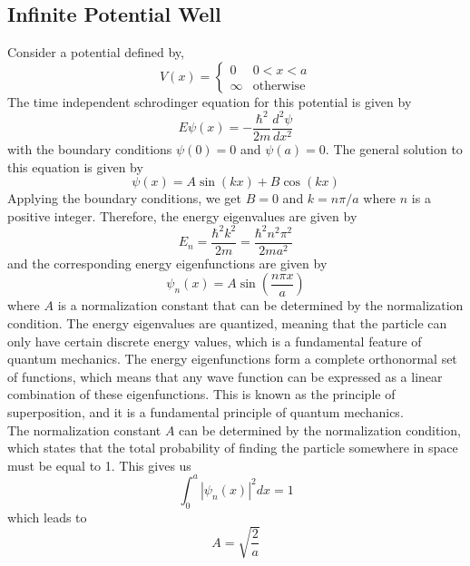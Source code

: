 \documentclass{article}
\begin{document}
\subsection{Infinite Potential Well}
Consider a potential defined by,
\[V(x) = \begin{cases} 
      0 & 0 < x < a \\
      \infty & \text{otherwise}    
    \end{cases}
\]
The time independent schrodinger equation for this potential is given by    
\[E\psi(x) = -\frac{\hbar^2}{2m}\frac{d^2\psi}{dx^2}\]
with the boundary conditions $\psi(0) = 0$ and $\psi(a) = 0$. The general solution to this equation is given by
\[\psi(x) = A\sin(kx) + B\cos(kx)\]
Applying the boundary conditions, we get $B=0$ and $k = n\pi/a$ where $n$ is a positive integer. Therefore, the energy eigenvalues are given by
\[E_n = \frac{\hbar^2 k^2}{2m} = \frac{\hbar^2 n^2 \pi^2}{2ma^2}\]
and the corresponding energy eigenfunctions are given by            
\[\psi_n(x) = A\sin\left(\frac{n\pi x}{a}\right)\]
where $A$ is a normalization constant that can be determined by the normalization condition. The energy eigenvalues are quantized, meaning that the particle can only have certain discrete energy values, which is a fundamental feature of quantum mechanics. The energy eigenfunctions form a complete orthonormal set of functions, which means that any wave function can be expressed as a linear combination of these eigenfunctions. This is known as the principle of superposition, and it is a fundamental principle of quantum mechanics.       
\\ The normalization constant $A$ can be determined by the normalization condition, which states that the total probability of finding the particle somewhere in space must be equal to 1. This gives us
\[\int_0^a |\psi_n(x)|^2 dx = 1\]
which leads to          
\[A = \sqrt{\frac{2}{a}}\]
\newpage     
\end{document}
